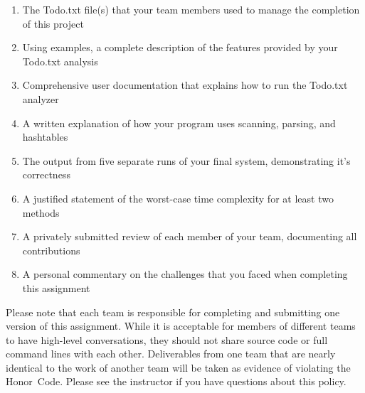   \vspace*{-.05in}
 \begin{enumerate}
  \itemsep0pt

  \item The Todo.txt file(s) that your team members used to manage the completion of this project

  \item Using examples, a complete description of the features provided by your Todo.txt analysis

  \item Comprehensive user documentation that explains how to run the Todo.txt analyzer

  \item A written explanation of how your program uses scanning, parsing, and hashtables

  \item The output from five separate runs of your final system, demonstrating it's correctness

  \item A justified statement of the worst-case time complexity for at least two methods

  \item A privately submitted review of each member of your team, documenting all contributions

  \item A personal commentary on the challenges that you faced when completing this assignment

  \end{enumerate}
  \vspace*{-.05in}

  Please note that each team is responsible for completing and submitting one version of this assignment.  While it is
  acceptable for members of different teams to have high-level conversations, they should not share source code or
  full command lines with each other.  Deliverables from one team that are nearly identical to the work of another team
  will be taken as evidence of violating the \mbox{Honor Code}.  Please see the instructor if you have questions about
  this policy.

  
